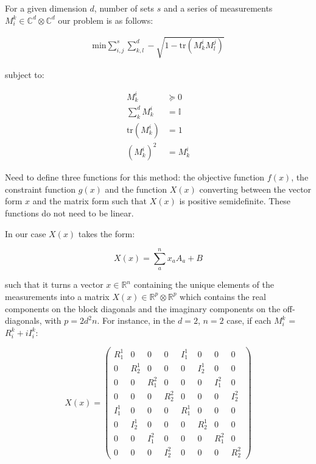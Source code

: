 \documentclass{article}
\begin{document}
For a given dimension $d$, number of sets $s$ and a series of measurements $M_i^k \in \mathbb{C}^d \otimes \mathbb{C}^d$ our problem is as follows:

\begin{align}
	\text{min} \sum_{i,j}^s \sum_{k,l}^d -\sqrt{1-\text{tr}(M_k^i M_l^j)} 
\end{align}

subject to:

\begin{align}
	M_k^i &\succeq 0 \\
	\sum_k^d M_k^i &= \mathbb{I} \\
	\text{tr}(M_k^i) &= 1 \\
	(M_k^i)^2 &= M_k^i
\end{align}

Need to define three functions for this method: the objective function $f(x)$, the constraint function $g(x)$ and the function $X(x)$ converting between the vector form $x$ and the matrix form such that $X(x)$ is positive semidefinite. These functions do not need to be linear.

In our case $X(x)$ takes the form:

\begin{equation}
	X(x) = \sum_a^n x_a A_a + B
\end{equation}

such that it turns a vector $x \in \mathbb{R}^n$ containing the unique elements of the measurements into a matrix $X(x) \in \mathbb{R}^p \otimes \mathbb{R}^p$ which contains the real components on the block diagonals and the imaginary components on the off-diagonals, with $p=2d^2n$. For instance, in the $d=2$, $n=2$ case, if each $M_i^k$ = $R_i^k + iI_i^k$:

\begin{equation}
	X(x) = 
	\begin{pmatrix}
		R_1^1 & 0 & 0 & 0 & I_1^1 & 0 & 0 & 0 \\
		0 & R_2^1 & 0 & 0 & 0 & I_2^1 & 0 & 0 \\
		0 & 0 & R_1^2 & 0 & 0 & 0 & I_1^2 & 0 \\
		0 & 0 & 0 & R_2^2 & 0 & 0 & 0 & I_2^2 \\
		I_1^1 & 0 & 0 & 0 & R_1^1 & 0 & 0 & 0 \\
		0 & I_2^1 & 0 & 0 & 0 & R_2^1 & 0 & 0 \\
		0 & 0 & I_1^2 & 0 & 0 & 0 & R_1^2 & 0 \\
		0 & 0 & 0 & I_2^2 & 0 & 0 & 0 & R_2^2
	\end{pmatrix}
\end{equation}
\end{document}

